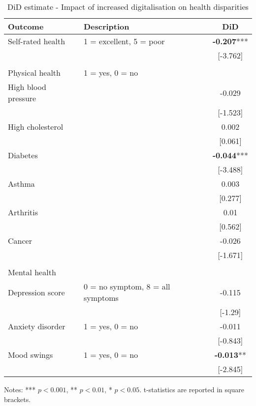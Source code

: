 \documentclass[11pt]{article}
\begin{document}
    \begin{table}[h!]
        \centering
        \caption{DiD estimate - Impact of increased digitalisation on health disparities}
        \label{tab:did}
        \begin{threeparttable}
            \begin{tabular}{llc}
                \toprule
                Outcome & Description & DiD \\
                \midrule
                Self-rated health & 1 = excellent, 5 = poor & \textbf{-0.207}*** \\
                &  & [-3.762] \\
                & & \\
                Physical health & 1 = yes, 0 = no & \\
                High blood pressure &  & -0.029 \\
                &  & [-1.523] \\
                High cholesterol &  & 0.002 \\
                &  & [0.061] \\
                Diabetes &  & \textbf{-0.044}*** \\
                &  & [-3.488] \\
                Asthma &  & 0.003 \\
                &  & [0.277] \\
                Arthritis &  & 0.01 \\
                &  & [0.562] \\
                Cancer &  & -0.026 \\
                &  & [-1.671] \\
                & & \\
                Mental health & & \\
                Depression score & 0 = no symptom, 8 = all symptoms & -0.115 \\
                &  & [-1.29] \\
                Anxiety disorder & 1 = yes, 0 = no & -0.011 \\
                &  & [-0.843] \\
                Mood swings & 1 = yes, 0 = no & \textbf{-0.013}** \\
                &  & [-2.845] \\
                \bottomrule
            \end{tabular}
            \begin{tablenotes}
                \footnotesize
                \item Notes: *** $p < 0.001$, ** $p < 0.01$, * $p < 0.05$. t-statistics are reported in square brackets.
            \end{tablenotes}
        \end{threeparttable}
    \end{table}
\end{document}
